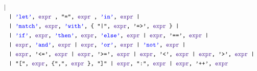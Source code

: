\documentclass{article}
\begin{document}
\begin{align*}
{		|}\\
	&\texttt{
		| \color{blue}'let'\color{black}, 
		\color{RoyalPurple}expr \color{black}, "=",	\color{RoyalPurple}expr \color{black},	 \color{blue}'in'\color{black}, \color{RoyalPurple}expr \color{black} 
		|}\\
	&\texttt{
		| \color{blue}'match'\color{black}, \color{RoyalPurple}expr\color{black}, \color{blue}'with'\color{black}, \{ "|", \color{RoyalPurple}expr\color{black}, '=>', \color{RoyalPurple}expr \color{black} \}
		|}\\
	&\texttt{
		| \color{blue}'if'\color{black}, \color{RoyalPurple}expr\color{black}, \color{blue}'then'\color{black}, \color{RoyalPurple}expr\color{black}, \color{blue}'else'\color{black}, \color{RoyalPurple}expr \color{black}
		| \color{RoyalPurple}expr\color{black}, '==',
		\color{RoyalPurple}expr \color{black}
		|}\\
	&\texttt{
		| \color{RoyalPurple}expr\color{black}, \color{blue}'and'\color{black}, \color{RoyalPurple}expr \color{black}
		| \color{RoyalPurple}expr\color{black}, \color{blue} 'or'\color{black}, \color{RoyalPurple}expr \color{black}
		| \color{blue} 'not'\color{black}, \color{RoyalPurple}expr \color{black} 
		|}\\
	&\texttt{
		| \color{RoyalPurple}expr\color{black}, '<=', \color{RoyalPurple}expr \color{black}
		| \color{RoyalPurple}expr\color{black}, '>=', \color{RoyalPurple}expr \color{black}
		| \color{RoyalPurple}expr\color{black}, '<', \color{RoyalPurple}expr \color{black}
		| \color{RoyalPurple}expr\color{black}, '>', \color{RoyalPurple}expr \color{black}
		|}\\
	&\texttt{
		| "[", \color{RoyalPurple}expr\color{black}, \{",", \color{RoyalPurple}expr \color{black}\}, "]"
		| \color{RoyalPurple} expr\color{black}, ":", \color{RoyalPurple}expr \color{black}
		| \color{RoyalPurple}expr\color{black}, '++', \color{RoyalPurple}expr \color{black}
	}
	\end{align*}
\end{document}
